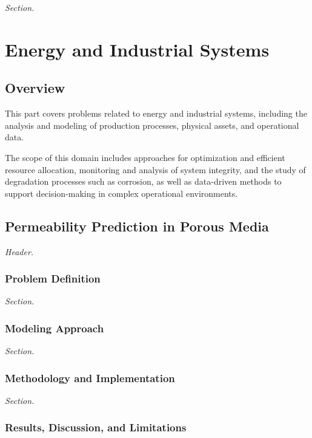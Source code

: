 \documentclass[
  12pt,
  letterpaper,
]{book}
\begin{document}
\emph{Section.}

\part{Energy and Industrial Systems}

\chapter*{Overview}\label{overview-3}


This part covers problems related to energy and industrial systems,
including the analysis and modeling of production processes, physical
assets, and operational data.

The scope of this domain includes approaches for optimization and
efficient resource allocation, monitoring and analysis of system
integrity, and the study of degradation processes such as corrosion, as
well as data-driven methods to support decision-making in complex
operational environments.

\chapter{Permeability Prediction in Porous
Media}\label{permeability-prediction-in-porous-media}

\emph{Header.}

\section{Problem Definition}\label{problem-definition-8}

\emph{Section.}

\section{Modeling Approach}\label{modeling-approach-8}

\emph{Section.}

\section{Methodology and
Implementation}\label{methodology-and-implementation-8}

\emph{Section.}

\section{Results, Discussion, and
Limitations}\label{results-discussion-and-limitations-8}
\end{document}
